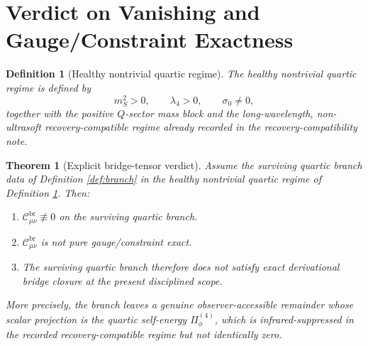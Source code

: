 \documentclass[11pt]{article}
\newtheorem{definition}{Definition}
\newtheorem{theorem}{Theorem}
\begin{document}
\section{Verdict on Vanishing and Gauge/Constraint Exactness}

\begin{definition}[Healthy nontrivial quartic regime]
\label{def:healthy}
The \emph{healthy nontrivial quartic regime} is defined by
\begin{equation}
m_S^2>0,
\qquad
\lambda_4>0,
\qquad
\sigma_0\neq 0,
\label{eq:healthy}
\end{equation}
together with the positive \(Q\)-sector mass block and the long-wavelength, non-ultrasoft recovery-compatible regime already recorded in the recovery-compatibility note.
\end{definition}

\begin{theorem}[Explicit bridge-tensor verdict]
\label{thm:verdict}
Assume the surviving quartic branch data of Definition \ref{def:branch} in the healthy nontrivial quartic regime of Definition \ref{def:healthy}. Then:
\begin{enumerate}
    \item \(\mathcal C_{\mu\nu}^{\mathrm{br}}\not\equiv 0\) on the surviving quartic branch.
    \item \(\mathcal C_{\mu\nu}^{\mathrm{br}}\) is not pure gauge/constraint exact.
    \item The surviving quartic branch therefore does not satisfy exact derivational bridge closure at the present disciplined scope.
\end{enumerate}
More precisely, the branch leaves a genuine observer-accessible remainder whose scalar projection is the quartic self-energy \(\Pi_\phi^{(4)}\), which is infrared-suppressed in the recorded recovery-compatible regime but not identically zero.
\end{theorem}
\end{document}
